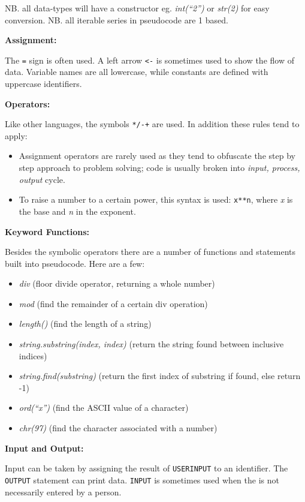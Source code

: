 \documentclass[10pt]{article}
\begin{document}
NB. all data-types will have a constructor eg. \emph{int(``2'')} or \emph{str(2)} for easy conversion.
NB. all iterable series in pseudocode are 1 based.

\textbf{Assignment:}

The \texttt{=} sign is often used. A left arrow \texttt{<-} is sometimes used to show the flow of data. Variable names are all lowercase, while constants are defined with uppercase identifiers.

\textbf{Operators:}

Like other languages, the symbols \texttt{*/-+} are used. In addition these rules tend to apply:

\begin{itemize}
\item Assignment operators are rarely used as they tend to obfuscate the step by step approach to problem solving; code is usually broken into \emph{input, process, output} cycle.
\item To raise a number to a certain power, this syntax is used: \texttt{x**n}, where \emph{x} is the base and \emph{n} in the exponent.
\end{itemize}

\textbf{Keyword Functions:}

Besides the symbolic operators there are a number of functions and statements built into pseudocode. Here are a few:

\begin{itemize}
\item \emph{div} (floor divide operator, returning a whole number)
\item \emph{mod} (find the remainder of a certain div operation)
\item \emph{length()} (find the length of a string)
\item \emph{string.substring(index, index)} (return the string found between inclusive indices)
\item \emph{string.find(substring)} (return the first index of substring if found, else return -1)
\item \emph{ord(``x'')} (find the ASCII value of a character)
\item \emph{chr(97)} (find the character associated with a number)
\end{itemize}

\textbf{Input and Output:}

Input can be taken by assigning the result of \texttt{USERINPUT} to an identifier. The \texttt{OUTPUT} statement can print data. \texttt{INPUT} is sometimes used when the is not necessarily entered by a person.
\end{document}
